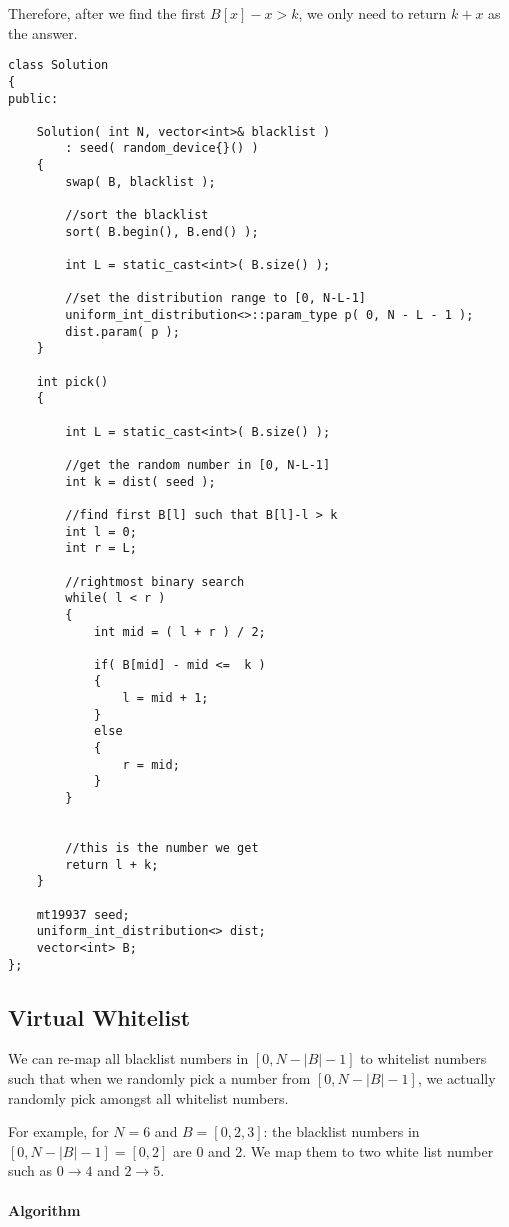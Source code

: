 Therefore, after we find the first $B[x]-x > k$, we only need to return $k+x$ as the answer.

\setcounter{lstlisting}{0}
\begin{lstlisting}[style=customc, caption={Binary Search}]
class Solution
{
public:

    Solution( int N, vector<int>& blacklist )
        : seed( random_device{}() )
    {
        swap( B, blacklist );

        //sort the blacklist
        sort( B.begin(), B.end() );

        int L = static_cast<int>( B.size() );

        //set the distribution range to [0, N-L-1]
        uniform_int_distribution<>::param_type p( 0, N - L - 1 );
        dist.param( p );
    }

    int pick()
    {

        int L = static_cast<int>( B.size() );

        //get the random number in [0, N-L-1]
        int k = dist( seed );

        //find first B[l] such that B[l]-l > k
        int l = 0;
        int r = L;

        //rightmost binary search
        while( l < r )
        {
            int mid = ( l + r ) / 2;

            if( B[mid] - mid <=  k )
            {
                l = mid + 1;
            }
            else
            {
                r = mid;
            }
        }


        //this is the number we get
        return l + k;
    }

    mt19937 seed;
    uniform_int_distribution<> dist;
    vector<int> B;
};
\end{lstlisting}

\subsection{Virtual Whitelist}
We can re-map all blacklist numbers in $[0,N−\lvert B\rvert-1]$ to whitelist numbers such that when we randomly pick a number from $[0,N−\lvert B\rvert-1]$, we actually randomly pick amongst all whitelist numbers.

For example, for $N=6$ and $B=[0,2,3]$: the blacklist numbers in $[0,N−\lvert B\rvert-1] = [0, 2]$ are 0 and 2. We map them to two white list number such as $0\to 4$ and $2\to 5$.

\paragraph{Algorithm} 

